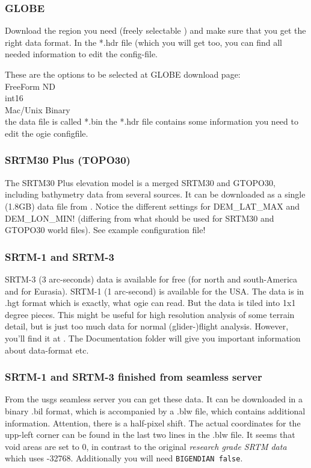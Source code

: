 \subsubsection{GLOBE}
Download the region you need (freely selectable \cite{globe}) and make sure that you
get the right data format. In the *.hdr file (which you will get too,
you can find all needed information to edit the config-file.

These are the options to be selected at GLOBE download page:\\
FreeForm ND\\
int16\\
Mac/Unix Binary\\

the data file is called   *.bin
the *.hdr file contains some information you need to edit the
ogie configfile.


\subsubsection{SRTM30 Plus (TOPO30)}
The SRTM30 Plus \cite{srtm30plus} elevation model is a merged SRTM30 and GTOPO30, including bathymetry data from several sources.
It can be downloaded as a single (1.8GB) data file from \cite{srtm30plus}.
Notice the different settings for DEM\_LAT\_MAX and DEM\_LON\_MIN! (differing from what should be used for SRTM30 and GTOPO30 world files).
See example configuration file!

\subsubsection{SRTM-1 and SRTM-3}
SRTM-3 (3 arc-seconds) data is available for free (for north and south-America and for Eurasia). SRTM-1
(1 arc-second) is available for the USA. The data is in .hgt format which is exactly, what ogie
can read. But the data is tiled into 1x1 degree pieces. This might be useful for high resolution analysis of
some terrain detail, but is just too much data for normal (glider-)flight analysis.
However, you'll find it at \cite{srtmv2}.
The Documentation folder will give you important information about data-format etc.


\subsubsection{SRTM-1 and SRTM-3 finished from seamless server}

From the usgs seamless server \cite{seamless} you can get these data.
It can be downloaded in a binary .bil format, which is accompanied by a .blw file, which contains additional information. Attention, there is a half-pixel shift.
The actual coordinates for the upp-left corner can be found in the last two lines in the .blw file.
It seems that void areas are set to 0, in contrast to the original \emph{research grade SRTM data} which uses -32768.
Additionally you will need \texttt{BIGENDIAN false}.


